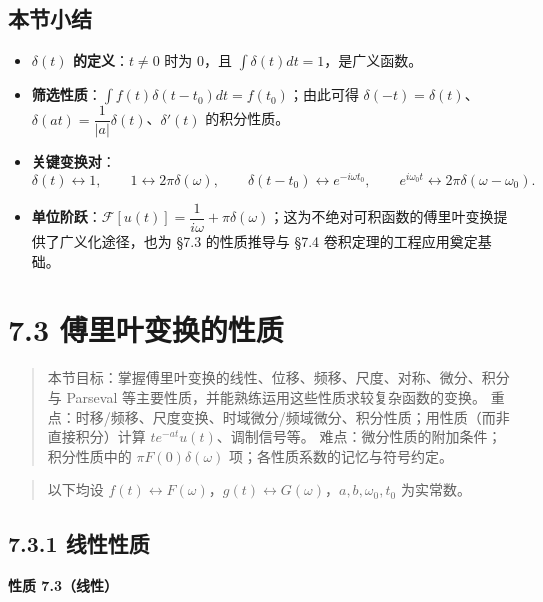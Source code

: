 \subsection{本节小结}\label{ux672cux8282ux5c0fux7ed3-18}

\begin{itemize}
\tightlist
\item
  \textbf{\(\delta(t)\) 的定义}：\(t\neq0\) 时为 \(0\)，且
  \(\int\delta(t)dt=1\)，是广义函数。
\item
  \textbf{筛选性质}：\(\int f(t)\delta(t-t_0)dt=f(t_0)\)；由此可得
  \(\delta(-t)=\delta(t)\)、\(\delta(at)=\dfrac{1}{|a|}\delta(t)\)、\(\delta'(t)\)
  的积分性质。
\item
  \textbf{关键变换对}： \[
  \delta(t)\leftrightarrow 1,\qquad
  1\leftrightarrow 2\pi\delta(\omega),\qquad
  \delta(t-t_0)\leftrightarrow e^{-i\omega t_0},\qquad
  e^{i\omega_0 t}\leftrightarrow 2\pi\delta(\omega-\omega_0).
  \]
\item
  \textbf{单位阶跃}：\(\mathcal F[u(t)]=\dfrac{1}{i\omega}+\pi\delta(\omega)\)；这为不绝对可积函数的傅里叶变换提供了广义化途径，也为
  §7.3 的性质推导与 §7.4 卷积定理的工程应用奠定基础。
\end{itemize}

\section{7.3
傅里叶变换的性质}\label{ux5085ux91ccux53f6ux53d8ux6362ux7684ux6027ux8d28}

\begin{quote}
本节目标：掌握傅里叶变换的线性、位移、频移、尺度、对称、微分、积分与
Parseval 等主要性质，并能熟练运用这些性质求较复杂函数的变换。
重点：时移/频移、尺度变换、时域微分/频域微分、积分性质；用性质（而非直接积分）计算
\(te^{-at}u(t)\)、调制信号等。 难点：微分性质的附加条件；积分性质中的
\(\pi F(0)\delta(\omega)\) 项；各性质系数的记忆与符号约定。
\end{quote}

\begin{quote}
以下均设
\(f(t)\leftrightarrow F(\omega)\)，\(g(t)\leftrightarrow G(\omega)\)，\(a,b,\omega_0,t_0\)
为实常数。
\end{quote}

\subsection{7.3.1 线性性质}\label{ux7ebfux6027ux6027ux8d28}

\textbf{性质 7.3（线性）}

